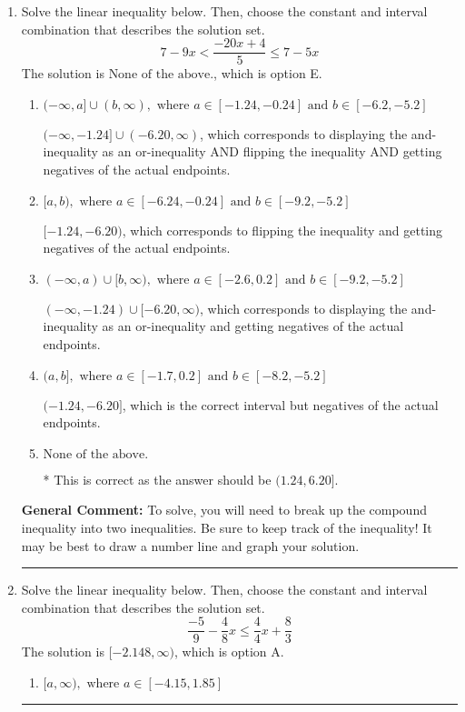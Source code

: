 \documentclass{extbook}[14pt]
\newcommand{\litem}[1]{\item #1

\rule{\textwidth}{0.4pt}}
\begin{document}
\begin{enumerate}
{\begin{enumerate}[label=\Alph*.]
You may have chosen this if you thought the inequality did not match the ends of the intervals.
\end{enumerate}

\textbf{General Comment:} Remember that less/greater than or equal to includes the endpoint, while less/greater do not. Also, remember that you need to flip the inequality when you multiply or divide by a negative.
}
\litem{
Solve the linear inequality below. Then, choose the constant and interval combination that describes the solution set.
\[ 7 - 9 x < \frac{-20 x + 4}{5} \leq 7 - 5 x \]
The solution is \( \text{None of the above.} \), which is option E.\begin{enumerate}[label=\Alph*.]
\item \( (-\infty, a] \cup (b, \infty), \text{ where } a \in [-1.24, -0.24] \text{ and } b \in [-6.2, -5.2] \)

$(-\infty, -1.24] \cup (-6.20, \infty)$, which corresponds to displaying the and-inequality as an or-inequality AND flipping the inequality AND getting negatives of the actual endpoints.
\item \( [a, b), \text{ where } a \in [-6.24, -0.24] \text{ and } b \in [-9.2, -5.2] \)

$[-1.24, -6.20)$, which corresponds to flipping the inequality and getting negatives of the actual endpoints.
\item \( (-\infty, a) \cup [b, \infty), \text{ where } a \in [-2.6, 0.2] \text{ and } b \in [-9.2, -5.2] \)

$(-\infty, -1.24) \cup [-6.20, \infty)$, which corresponds to displaying the and-inequality as an or-inequality and getting negatives of the actual endpoints.
\item \( (a, b], \text{ where } a \in [-1.7, 0.2] \text{ and } b \in [-8.2, -5.2] \)

$(-1.24, -6.20]$, which is the correct interval but negatives of the actual endpoints.
\item \( \text{None of the above.} \)

* This is correct as the answer should be $(1.24, 6.20]$.
\end{enumerate}

\textbf{General Comment:} To solve, you will need to break up the compound inequality into two inequalities. Be sure to keep track of the inequality! It may be best to draw a number line and graph your solution.
}
\litem{
Solve the linear inequality below. Then, choose the constant and interval combination that describes the solution set.
\[ \frac{-5}{9} - \frac{4}{8} x \leq \frac{4}{4} x + \frac{8}{3} \]
The solution is \( [-2.148, \infty) \), which is option A.\begin{enumerate}[label=\Alph*.]
\item \( [a, \infty), \text{ where } a \in [-4.15, 1.85] \)


\end{enumerate}}
\end{enumerate}
\end{document}
